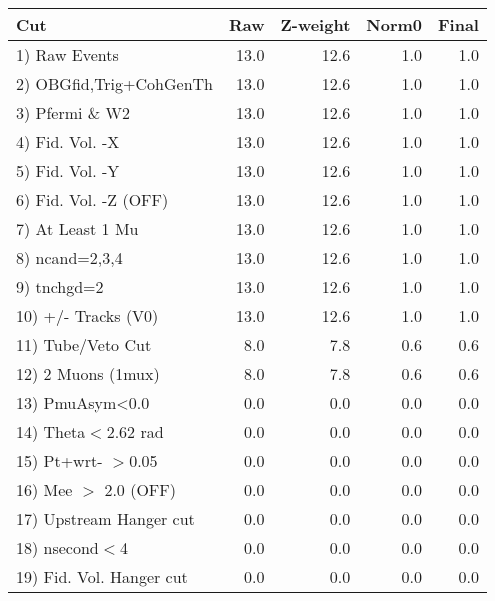  \begin{table}[h!]\centering
 \begin{tabular}{||l||r|r|r|r||}
 \hline
 \hline
 Cut & Raw & Z-weight & Norm0 & Final \\
 \hline
  1) Raw Events           &        13.0 &        12.6 &         1.0 &         1.0 \\
  2) OBGfid,Trig+CohGenTh &        13.0 &        12.6 &         1.0 &         1.0 \\
  3) Pfermi \& W2         &        13.0 &        12.6 &         1.0 &         1.0 \\
  4) Fid. Vol. -X         &        13.0 &        12.6 &         1.0 &         1.0 \\
  5) Fid. Vol. -Y         &        13.0 &        12.6 &         1.0 &         1.0 \\
  6) Fid. Vol. -Z (OFF)   &        13.0 &        12.6 &         1.0 &         1.0 \\
  7) At Least 1 Mu        &        13.0 &        12.6 &         1.0 &         1.0 \\
  8) ncand=2,3,4          &        13.0 &        12.6 &         1.0 &         1.0 \\
  9) tnchgd=2             &        13.0 &        12.6 &         1.0 &         1.0 \\
 10) +/- Tracks (V0)      &        13.0 &        12.6 &         1.0 &         1.0 \\
 11) Tube/Veto Cut        &         8.0 &         7.8 &         0.6 &         0.6 \\
 12) 2 Muons (1mux)       &         8.0 &         7.8 &         0.6 &         0.6 \\
 13) PmuAsym<0.0          &         0.0 &         0.0 &         0.0 &         0.0 \\
 14) Theta$<$2.62 rad     &         0.0 &         0.0 &         0.0 &         0.0 \\
 15) Pt+wrt- $>$0.05      &         0.0 &         0.0 &         0.0 &         0.0 \\
 16) Mee $>$ 2.0  (OFF)   &         0.0 &         0.0 &         0.0 &         0.0 \\
 17) Upstream Hanger cut  &         0.0 &         0.0 &         0.0 &         0.0 \\
 18) nsecond$<$4          &         0.0 &         0.0 &         0.0 &         0.0 \\
 19) Fid. Vol. Hanger cut &         0.0 &         0.0 &         0.0 &         0.0 \\

\end{tabular}
\end{table}
